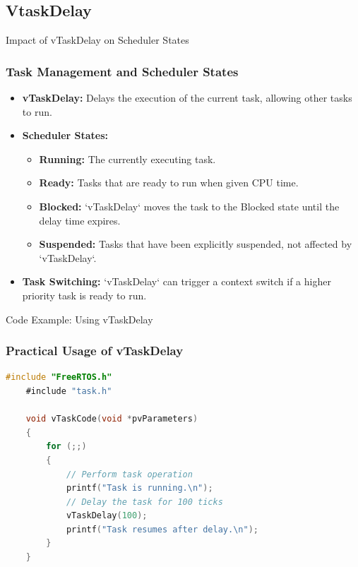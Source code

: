 \documentclass[10pt]{beamer}
\begin{document}
\subsection{VtaskDelay}
\begin{frame}{Impact of vTaskDelay on Scheduler States}
  \frametitle{Task Management and Scheduler States}
  \begin{itemize}
    \item \textbf{vTaskDelay:} Delays the execution of the current task, allowing other tasks to run.
    \item \textbf{Scheduler States:}
      \begin{itemize}
        \item \textbf{Running:} The currently executing task.
        \item \textbf{Ready:} Tasks that are ready to run when given CPU time.
        \item \textbf{Blocked:} `vTaskDelay` moves the task to the Blocked state until the delay time expires.
        \item \textbf{Suspended:} Tasks that have been explicitly suspended, not affected by `vTaskDelay`.
      \end{itemize}
    \item \textbf{Task Switching:} `vTaskDelay` can trigger a context switch if a higher priority task is ready to run.
  \end{itemize}
  \end{frame}

\begin{frame}[fragile]{Code Example: Using vTaskDelay}
    \frametitle{Practical Usage of vTaskDelay}
    \begin{lstlisting}[language=C]
    #include "FreeRTOS.h"
    #include "task.h"
    
    void vTaskCode(void *pvParameters)
    {
        for (;;)
        {
            // Perform task operation
            printf("Task is running.\n");
            // Delay the task for 100 ticks
            vTaskDelay(100);
            printf("Task resumes after delay.\n");
        }
    }
    \end{lstlisting}
\end{frame}
\end{document}
